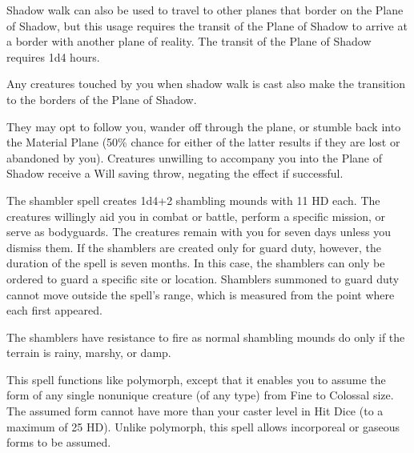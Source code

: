 \begin{multicols}{2}
\begin{small}
\smallskip\noindent Shadow walk can also be used to travel to other planes that border on the Plane of Shadow, but this usage requires the transit of the Plane of Shadow to arrive at a border with another plane of reality. The transit of the Plane of Shadow requires 1d4 hours.

\smallskip\noindent Any creatures touched by you when shadow walk is cast also make the transition to the borders of the Plane of Shadow.

\smallskip\noindent They may opt to follow you, wander off through the plane, or stumble back into the Material Plane (50\% chance for either of the latter results if they are lost or abandoned by you). Creatures unwilling to accompany you into the Plane of Shadow receive a Will saving throw, negating the effect if successful.

\noindent The shambler spell creates 1d4+2 shambling mounds with 11 HD each. The creatures willingly aid you in combat or battle, perform a specific mission, or serve as bodyguards. The creatures remain with you for seven days unless you dismiss them. If the shamblers are created only for guard duty, however, the duration of the spell is seven months. In this case, the shamblers can only be ordered to guard a specific site or location. Shamblers summoned to guard duty cannot move outside the spell's range, which is measured from the point where each first appeared. 

\smallskip\noindent The shamblers have resistance to fire as normal shambling mounds do only if the terrain is rainy, marshy, or damp.

\noindent This spell functions like polymorph, except that it enables you to assume the form of any single nonunique creature (of any type) from Fine to Colossal size. The assumed form cannot have more than your caster level in Hit Dice (to a maximum of 25 HD). Unlike polymorph, this spell allows incorporeal or gaseous forms to be assumed.


\end{small}
\end{multicols}
